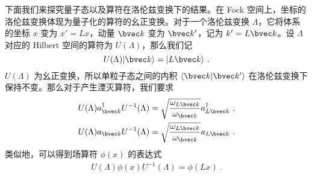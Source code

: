 下面我们来探究量子态以及算符在洛伦兹变换下的结果。在 Fock 空间上，坐标的洛伦兹变换体现为量子化的算符的幺正变换。对于一个洛伦兹变换 $\Lambda$，它将体系的坐标 $x$ 变为 $x'=L x$，动量 $\bvec k$ 变为 $\bvec k'$，记为 $k'=L \bvec k$。设 $\Lambda$ 对应的 Hilbert 空间的算符为 $U(\Lambda)$，那么我们记
\begin{equation}
U(\Lambda)|\bvec k\rangle=|L \bvec k\rangle~.
\end{equation}
$U(\Lambda)$ 为幺正变换，所以单粒子态之间的内积 $\langle \bvec k|\bvec k'\rangle$ 在洛伦兹变换下保持不变。那么对于产生湮灭算符，我们要求
\begin{equation}
\begin{aligned}
&U(\Lambda)a^\dagger_{\bvec k}U^{-1}(\Lambda)=\sqrt{\frac{\omega_{L \bvec k}}{\omega_{\bvec k}}} a^\dagger_{L \bvec k}~,\\
&U(\Lambda)a_{\bvec k}U^{-1}(\Lambda)=\sqrt{\frac{\omega_{L \bvec k}}{\omega_{\bvec k}}} a_{L \bvec k}~.
\end{aligned}
\end{equation}
类似地，可以得到场算符 $\phi(x)$ 的表达式
\begin{equation}\label{eq_quanti_4}
\begin{aligned}
U(\Lambda)\phi(x)U^{-1}(\Lambda)=\phi(Lx)~.
\end{aligned}
\end{equation}

